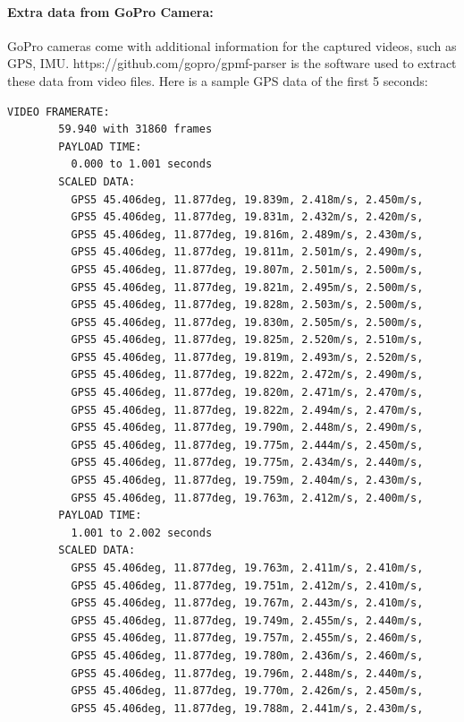 \documentclass[11pt]{article}
\begin{document}
    \paragraph{Extra data from GoPro Camera:}
    GoPro cameras come with additional information for the captured videos, such as GPS, IMU.
    https://github.com/gopro/gpmf-parser is the software used to extract these data from video files.
    Here is a sample GPS data of the first 5 seconds:

    \begin{lstlisting}[language=bash,caption={gpmf-parser output},label={lst:lstlisting}]
        VIDEO FRAMERATE:
        59.940 with 31860 frames
        PAYLOAD TIME:
          0.000 to 1.001 seconds
        SCALED DATA:
          GPS5 45.406deg, 11.877deg, 19.839m, 2.418m/s, 2.450m/s,
          GPS5 45.406deg, 11.877deg, 19.831m, 2.432m/s, 2.420m/s,
          GPS5 45.406deg, 11.877deg, 19.816m, 2.489m/s, 2.430m/s,
          GPS5 45.406deg, 11.877deg, 19.811m, 2.501m/s, 2.490m/s,
          GPS5 45.406deg, 11.877deg, 19.807m, 2.501m/s, 2.500m/s,
          GPS5 45.406deg, 11.877deg, 19.821m, 2.495m/s, 2.500m/s,
          GPS5 45.406deg, 11.877deg, 19.828m, 2.503m/s, 2.500m/s,
          GPS5 45.406deg, 11.877deg, 19.830m, 2.505m/s, 2.500m/s,
          GPS5 45.406deg, 11.877deg, 19.825m, 2.520m/s, 2.510m/s,
          GPS5 45.406deg, 11.877deg, 19.819m, 2.493m/s, 2.520m/s,
          GPS5 45.406deg, 11.877deg, 19.822m, 2.472m/s, 2.490m/s,
          GPS5 45.406deg, 11.877deg, 19.820m, 2.471m/s, 2.470m/s,
          GPS5 45.406deg, 11.877deg, 19.822m, 2.494m/s, 2.470m/s,
          GPS5 45.406deg, 11.877deg, 19.790m, 2.448m/s, 2.490m/s,
          GPS5 45.406deg, 11.877deg, 19.775m, 2.444m/s, 2.450m/s,
          GPS5 45.406deg, 11.877deg, 19.775m, 2.434m/s, 2.440m/s,
          GPS5 45.406deg, 11.877deg, 19.759m, 2.404m/s, 2.430m/s,
          GPS5 45.406deg, 11.877deg, 19.763m, 2.412m/s, 2.400m/s,
        PAYLOAD TIME:
          1.001 to 2.002 seconds
        SCALED DATA:
          GPS5 45.406deg, 11.877deg, 19.763m, 2.411m/s, 2.410m/s,
          GPS5 45.406deg, 11.877deg, 19.751m, 2.412m/s, 2.410m/s,
          GPS5 45.406deg, 11.877deg, 19.767m, 2.443m/s, 2.410m/s,
          GPS5 45.406deg, 11.877deg, 19.749m, 2.455m/s, 2.440m/s,
          GPS5 45.406deg, 11.877deg, 19.757m, 2.455m/s, 2.460m/s,
          GPS5 45.406deg, 11.877deg, 19.780m, 2.436m/s, 2.460m/s,
          GPS5 45.406deg, 11.877deg, 19.796m, 2.448m/s, 2.440m/s,
          GPS5 45.406deg, 11.877deg, 19.770m, 2.426m/s, 2.450m/s,
          GPS5 45.406deg, 11.877deg, 19.788m, 2.441m/s, 2.430m/s,

\end{lstlisting}
\end{document}
